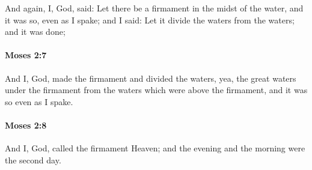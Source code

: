 			And again, I, God, said: Let there be a firmament in the midst of the water, and it was so, even as I spake; and I said: Let it divide the waters from the waters; and it was done;


		\paragraph{Moses 2:7} %
			\label{MOSES-2-7}

			And I, God, made the firmament and divided the waters, yea, the great waters under the firmament from the waters which were above the firmament, and it was so even as I spake.


		\paragraph{Moses 2:8} %
			\label{MOSES-2-8}

			And I, God, called the firmament Heaven; and the evening and the morning were the second day.


